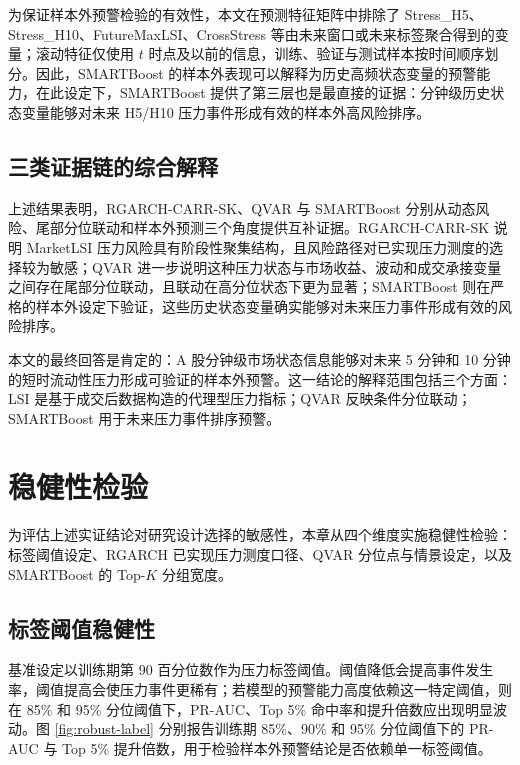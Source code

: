 \documentclass[12pt,a4paper]{ctexart}
\begin{document}
\begin{sloppypar}
为保证样本外预警检验的有效性，本文在预测特征矩阵中排除了 Stress\_H5、Stress\_H10、FutureMaxLSI、CrossStress 等由未来窗口或未来标签聚合得到的变量；滚动特征仅使用 $t$ 时点及以前的信息，训练、验证与测试样本按时间顺序划分。因此，SMARTBoost 的样本外表现可以解释为历史高频状态变量的预警能力，在此设定下，SMARTBoost 提供了第三层也是最直接的证据：分钟级历史状态变量能够对未来 H5/H10 压力事件形成有效的样本外高风险排序。
\end{sloppypar}


\subsection{三类证据链的综合解释}
\label{subsec:synthesis}

上述结果表明，RGARCH-CARR-SK、QVAR 与 SMARTBoost 分别从动态风险、尾部分位联动和样本外预测三个角度提供互补证据。RGARCH-CARR-SK 说明 MarketLSI 压力风险具有阶段性聚集结构，且风险路径对已实现压力测度的选择较为敏感；QVAR 进一步说明这种压力状态与市场收益、波动和成交承接变量之间存在尾部分位联动，且联动在高分位状态下更为显著；SMARTBoost 则在严格的样本外设定下验证，这些历史状态变量确实能够对未来压力事件形成有效的风险排序。

本文的最终回答是肯定的：A 股分钟级市场状态信息能够对未来 5 分钟和 10 分钟的短时流动性压力形成可验证的样本外预警。这一结论的解释范围包括三个方面：LSI 是基于成交后数据构造的代理型压力指标；QVAR 反映条件分位联动；SMARTBoost 用于未来压力事件排序预警。


\section{稳健性检验}

为评估上述实证结论对研究设计选择的敏感性，本章从四个维度实施稳健性检验：标签阈值设定、RGARCH 已实现压力测度口径、QVAR 分位点与情景设定，以及 SMARTBoost 的 Top-$K$ 分组宽度。

\subsection{标签阈值稳健性}

基准设定以训练期第 90 百分位数作为压力标签阈值。阈值降低会提高事件发生率，阈值提高会使压力事件更稀有；若模型的预警能力高度依赖这一特定阈值，则在 85\% 和 95\% 分位阈值下，PR-AUC、Top 5\% 命中率和提升倍数应出现明显波动。图 \ref{fig:robust-label} 分别报告训练期 85\%、90\% 和 95\% 分位阈值下的 PR-AUC 与 Top 5\% 提升倍数，用于检验样本外预警结论是否依赖单一标签阈值。
\end{document}
